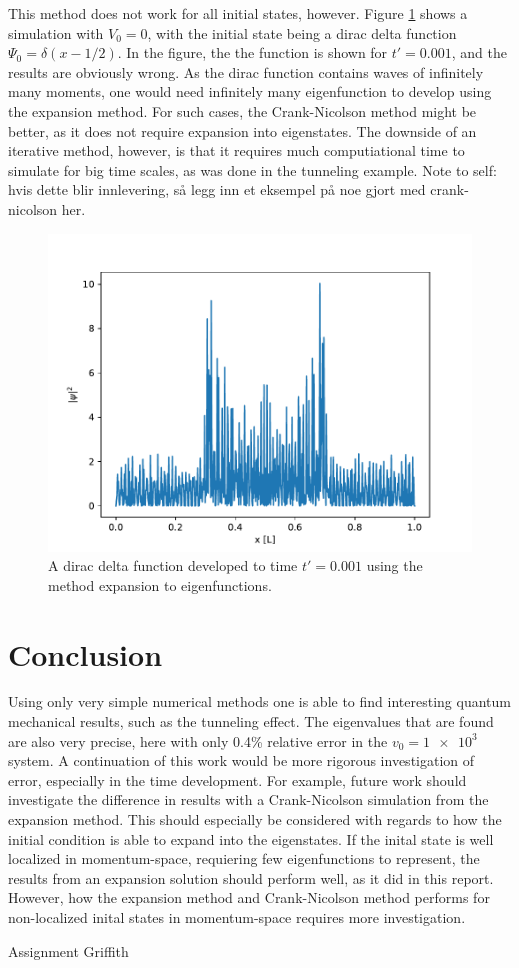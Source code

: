 \documentclass[a4paper, 11pt]{article}
\begin{document}
This method does not work for all initial states, however.
Figure \ref{fig:delta} shows a simulation with $V_0 = 0$, with the initial state being a dirac delta function $\Psi_0 = \delta(x - 1/2)$.
In the figure, the the function is shown for $t'=0.001$, and the results are obviously wrong.
As the dirac function contains waves of infinitely many moments, one would need infinitely many eigenfunction to develop using the expansion method.
For such cases, the Crank-Nicolson method might be better, as it does not require expansion into eigenstates.
The downside of an iterative method, however, is that it requires much computiational time to simulate for big time scales, as was done in the tunneling example.
Note to self: hvis dette blir innlevering, så legg inn et eksempel på noe gjort med crank-nicolson her.
\begin{figure}[ht]
\centering
\includegraphics[width=.5\textwidth]{media/delta}
\caption{A dirac delta function developed to time $t'=0.001$ using the method expansion to eigenfunctions. \label{fig:delta}}
\end{figure}

\section{Conclusion}
Using only very simple numerical methods one is able to find interesting quantum mechanical results, such as the tunneling effect.
The eigenvalues that are found are also very precise, here with only 0.4\% relative error in the $v_0 = \num{1e3}$ system.
A continuation of this work would be more rigorous investigation of error, especially in the time development.
For example, future work should investigate the difference in results with a Crank-Nicolson simulation from the expansion method.
This should especially be considered with regards to how the initial condition is able to expand into the eigenstates.
If the inital state is well localized in momentum-space, requiering few eigenfunctions to represent, the results from an expansion solution should perform well, as it did in this report.
However, how the expansion method and Crank-Nicolson method performs for non-localized inital states in momentum-space requires more investigation.

\begin{thebibliography}{9}
 Assignment
 Griffith
\end{thebibliography}
\end{document}
